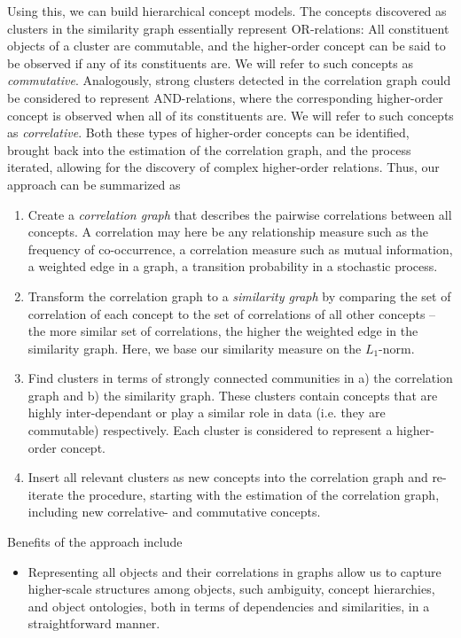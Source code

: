 \documentclass{sig-alternate}
\begin{document}
Using this, we can build hierarchical concept models.
The concepts discovered as clusters in the similarity graph essentially represent OR-relations:
All constituent objects of a cluster are commutable, and the higher-order concept can be said to be observed if any of its constituents are. We will refer to such concepts as \emph{commutative}.
Analogously, strong clusters detected in the correlation graph could be considered to represent AND-relations,
where the corresponding higher-order concept is observed when all of its constituents are. We will refer to such concepts as \emph{correlative}.
Both these types of
higher-order concepts can be identified, brought back into the estimation of the correlation graph, and the process
iterated, allowing for the discovery of complex higher-order relations. Thus, our approach can be summarized as
\begin{enumerate}
\item Create a \emph{correlation graph} that describes the pairwise correlations between all concepts. A correlation may here be any relationship measure such as
the frequency of co-occurrence, a correlation measure such as mutual information, a weighted edge in a graph, a
transition probability in a stochastic process.
\item Transform the correlation graph to a \emph{similarity graph} by comparing the set of correlation of each concept
to the set of correlations of all other concepts -- the more similar set of correlations, the higher the weighted edge in the
similarity graph. Here, we base our similarity measure on the $L_1$-norm.
\item Find clusters in terms of strongly connected communities in a) the correlation graph and
b) the similarity graph. These clusters contain concepts
that are highly inter-dependant or play a similar role in data (i.e. they are commutable) respectively. Each cluster is considered to represent a higher-order concept.
\item Insert all relevant clusters as new concepts into the correlation graph and re-iterate the procedure, starting with the estimation of the correlation graph, including new correlative- and commutative concepts.
\end{enumerate}

Benefits of the approach include
\begin{itemize}
\item Representing all objects and their correlations in graphs allow us to capture higher-scale
structures among objects, such ambiguity, concept hierarchies, and object ontologies, both in terms of dependencies and
similarities, in a straightforward manner.
\end{itemize}
\end{document}

